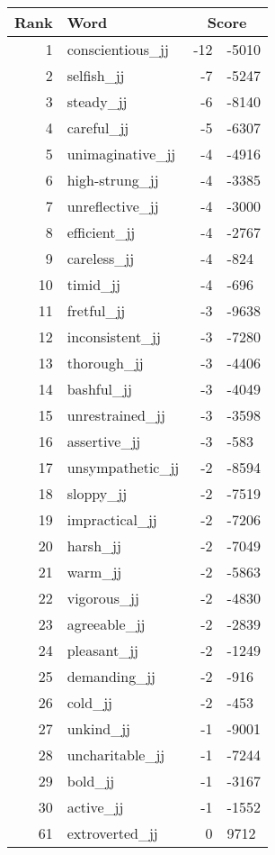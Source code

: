 \begin{longtable}[!htbp]{| rlr@{.}l |}
    \hline
    \textbf{Rank} & \textbf{Word} & \multicolumn{2}{c|}{\textbf{Score}} \\
    \hline
    \endhead
    1 & conscientious\_jj & -12 & -5010 \\
    2 & selfish\_jj & -7 & -5247 \\
    3 & steady\_jj & -6 & -8140 \\
    4 & careful\_jj & -5 & -6307 \\
    5 & unimaginative\_jj & -4 & -4916 \\
    6 & high-strung\_jj & -4 & -3385 \\
    7 & unreflective\_jj & -4 & -3000 \\
    8 & efficient\_jj & -4 & -2767 \\
    9 & careless\_jj & -4 & -824 \\
    10 & timid\_jj & -4 & -696 \\
    11 & fretful\_jj & -3 & -9638 \\
    12 & inconsistent\_jj & -3 & -7280 \\
    13 & thorough\_jj & -3 & -4406 \\
    14 & bashful\_jj & -3 & -4049 \\
    15 & unrestrained\_jj & -3 & -3598 \\
    16 & assertive\_jj & -3 & -583 \\
    17 & unsympathetic\_jj & -2 & -8594 \\
    18 & sloppy\_jj & -2 & -7519 \\
    19 & impractical\_jj & -2 & -7206 \\
    20 & harsh\_jj & -2 & -7049 \\
    21 & warm\_jj & -2 & -5863 \\
    22 & vigorous\_jj & -2 & -4830 \\
    23 & agreeable\_jj & -2 & -2839 \\
    24 & pleasant\_jj & -2 & -1249 \\
    25 & demanding\_jj & -2 & -916 \\
    26 & cold\_jj & -2 & -453 \\
    27 & unkind\_jj & -1 & -9001 \\
    28 & uncharitable\_jj & -1 & -7244 \\
    29 & bold\_jj & -1 & -3167 \\
    30 & active\_jj & -1 & -1552 \\
    61 & extroverted\_jj & 0 & 9712 \\

\end{longtable}
